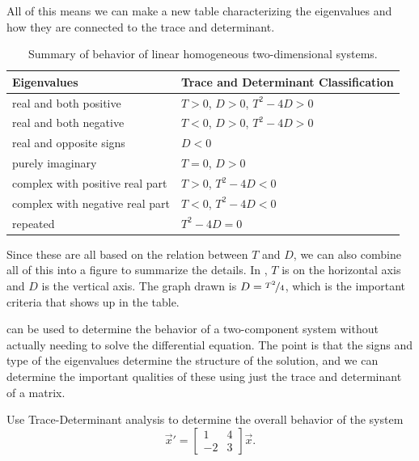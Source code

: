 All of this means we can make a new table characterizing the eigenvalues and how they are connected to the trace and determinant. 

\begin{table}[h!t]
\mybeginframe
\capstart
\begin{center}
\begin{tabular}{@{}ll@{}}
\toprule
Eigenvalues & Trace and Determinant Classification \\
\midrule
real and both positive & $T > 0$, $D > 0$, $T^2 - 4D > 0$  \\
real and both negative &  $T < 0$, $D > 0$, $T^2 - 4D > 0$\\
real and opposite signs & $D < 0$ \\
purely imaginary &  $T = 0$, $D > 0$\\
complex with positive real part & $T > 0$, $T^2 - 4D < 0$  \\
complex with negative real part &  $T < 0$, $T^2 - 4D < 0$ \\
repeated & $T^2 - 4D = 0$ \\
\bottomrule
\end{tabular}
\end{center}
\caption{Summary of behavior of linear homogeneous two-dimensional systems.\label{pln:behtabTD}}
\myendframe
\end{table}

Since these are all based on the relation between $T$ and $D$, we can also combine all of this into a figure to summarize the details. In , $T$ is on the horizontal axis and $D$ is the vertical axis. The graph drawn is $D = \nicefrac{T^2}{4}$, which is the important criteria that shows up in the table. 

\begin{myfig}
\capstart
{}
\caption{Trace-Determinant plane for analysis of two-component linear systems. \label{fig:TDPlaneAnalysis}}
\end{myfig}

 can be used to determine the behavior of a two-component system without actually needing to solve the differential equation. The point is that the signs and type of the eigenvalues determine the structure of the solution, and we can determine the important qualities of these using just the trace and determinant of a matrix.

\begin{example}
Use Trace-Determinant analysis to determine the overall behavior of the system
\begin{equation*}
{\vec{x}}' = \begin{bmatrix} 1 & 4 \\ -2 & 3 \end{bmatrix}\vec{x}.
\end{equation*}
\end{example}

